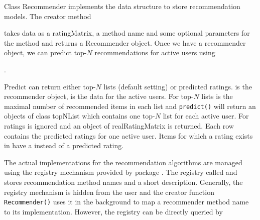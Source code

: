 \documentclass[nojss]{jss}
\newcommand{\class}[1]{\mbox{\textsf{#1}}}
\newcommand{\func}[1]{\mbox{\texttt{#1()}}}
\begin{document}
Class \class{Recommender} implements the data structure to store recommendation
models. The creator method 

\begin{center}
\end{center}

takes data as a \class{ratingMatrix},
a method name and some optional parameters for the method and
returns a \class{Recommender} object. Once we have a recommender object,
we can predict top-$N$ recommendations for active users using

\begin{center}
. 

\end{center}

Predict can return either top-$N$ lists (default setting) or predicted ratings.
 is the recommender
object,  is the data for the active users.
For top-$N$ lists  is
the maximal number of recommended items in each list and \func{predict} will
return an objects of class \class{topNList} which contains
one top-$N$ list for each active user. For ratings  is ignored
and an object of \class{realRatingMatrix} is returned. Each row
contains the predicted ratings for one active user. Items for which a
rating exists in  have a  instead of a 
predicted rating.


The actual implementations for the recommendation algorithms are 
managed using the registry mechanism provided by package .
The registry called  
and stores recommendation method names and a short description.
Generally, the registry mechanism is hidden from the user and the
creator function \func{Recommender} uses it in the background to map 
a recommender method name to its implementation. However, the 
registry can be directly queried by

\begin{center}
\end{center}
\end{document}
